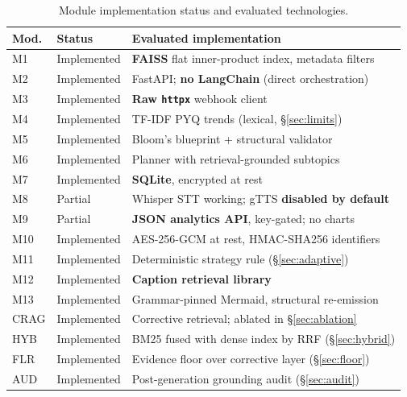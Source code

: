 \documentclass[conference]{IEEEtran}
\begin{document}
\begin{table}[htbp]
\caption{Module implementation status and evaluated technologies.}
\label{tab:status}
\centering
\footnotesize
\setlength{\tabcolsep}{3pt}
\begin{tabular}{@{}p{0.7cm} p{1.3cm} p{5.4cm}@{}}
\toprule
\textbf{Mod.} & \textbf{Status} & \textbf{Evaluated implementation} \\
\midrule
M1 & Implemented & \textbf{FAISS} flat inner-product index, metadata filters \\
M2 & Implemented & FastAPI; \textbf{no LangChain} (direct orchestration) \\
M3 & Implemented & \textbf{Raw \texttt{httpx}} webhook client \\
M4 & Implemented & TF-IDF PYQ trends (lexical, §\ref{sec:limits}) \\
M5 & Implemented & Bloom's blueprint + structural validator \\
M6 & Implemented & Planner with retrieval-grounded subtopics \\
M7 & Implemented & \textbf{SQLite}, encrypted at rest \\
M8 & Partial & Whisper STT working; gTTS \textbf{disabled by default} \\
M9 & Partial & \textbf{JSON analytics API}, key-gated; no charts \\
M10 & Implemented & AES-256-GCM at rest, HMAC-SHA256 identifiers \\
M11 & Implemented & Deterministic strategy rule (§\ref{sec:adaptive}) \\
M12 & Implemented & \textbf{Caption retrieval library} \\
M13 & Implemented & Grammar-pinned Mermaid, structural re-emission \\
CRAG & Implemented & Corrective retrieval; ablated in §\ref{sec:ablation} \\
HYB & Implemented & BM25 fused with dense index by RRF (§\ref{sec:hybrid}) \\
FLR & Implemented & Evidence floor over corrective layer (§\ref{sec:floor}) \\
AUD & Implemented & Post-generation grounding audit (§\ref{sec:audit}) \\
\bottomrule
\end{tabular}
\end{table}
\end{document}
